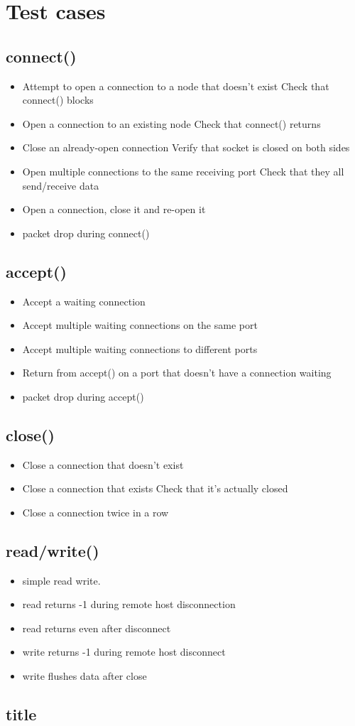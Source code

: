 \documentclass[]{article}
\begin{document}
\section{Test cases}
\subsection{connect()}
\begin{itemize}
	\item Attempt to open a connection to a node that doesn't exist
	\subitem Check that connect() blocks
	\item Open a connection to an existing node
	\subitem Check that connect() returns
	\item Close an already-open connection
	\subitem Verify that socket is closed on both sides
	\item Open multiple connections to the same receiving port
	\subitem Check that they all send/receive data
	\item Open a connection, close it and re-open it
	\item packet drop during connect()
\end{itemize}
\subsection{accept()}
\begin{itemize}
	\item Accept a waiting connection
	\item Accept multiple waiting connections on the same port
	\item Accept multiple waiting connections to different ports
	\item Return from accept() on a port that doesn't have a connection waiting
	\item packet drop during accept()
\end{itemize}
\subsection{close()}
\begin{itemize}
	\item Close a connection that doesn't exist
	\item Close a connection that exists
	\subitem Check that it's actually closed
	\item Close a connection twice in a row
\end{itemize}
\subsection{read/write()}
\begin{itemize}
	\item simple read write.
	\item read returns -1 during remote host disconnection 
	\item read returns even after disconnect
	\item write returns -1 during remote host disconnect
	\item write flushes data after close
\end{itemize}

\subsection{title}
\end{document}
